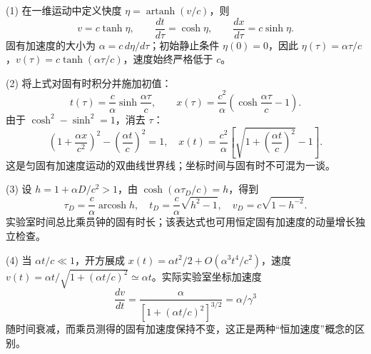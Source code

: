 (1) 在一维运动中定义快度 \(\eta=\operatorname{artanh}(v/c)\)，则
\[
v=c\tanh\eta,\qquad \frac{dt}{d\tau}=\cosh\eta,\qquad
\frac{dx}{d\tau}=c\sinh\eta.
\]
固有加速度的大小为 \(\alpha=c\,d\eta/d\tau\)；初始静止条件 \(\eta(0)=0\)，因此 \(\eta(\tau)=\alpha\tau/c\)，\(v(\tau)=c\tanh(\alpha\tau/c)\)，速度始终严格低于 \(c\)。

(2) 将上式对固有时积分并施加初值：
\[
t(\tau)=\frac c\alpha\sinh\frac{\alpha\tau}{c},\qquad
x(\tau)=\frac{c^2}{\alpha}\left(\cosh\frac{\alpha\tau}{c}-1\right).
\]
由于 \(\cosh^2-\sinh^2=1\)，消去 \(\tau\)：
\[
\left(1+\frac{\alpha x}{c^2}\right)^2-\left(\frac{\alpha t}{c}\right)^2=1,\quad
x(t)=\frac{c^2}{\alpha}\left[\sqrt{1+\left(\frac{\alpha t}{c}\right)^2}-1\right].
\]
这是匀固有加速度运动的双曲线世界线；坐标时间与固有时不可混为一谈。

(3) 设 \(h=1+\alpha D/c^2>1\)，由 \(\cosh(\alpha\tau_D/c)=h\)，得到
\[
\tau_D=\frac c\alpha\operatorname{arcosh}h,\quad
t_D=\frac c\alpha\sqrt{h^2-1},\quad
v_D=c\sqrt{1-h^{-2}}.
\]
实验室时间总比乘员钟的固有时长；该表达式也可用恒定固有加速度的动量增长独立检查。

(4) 当 \(\alpha t/c\ll1\)，开方展成 \(x(t)=\alpha t^2/2+O(\alpha^3t^4/c^2)\)，速度 \(v(t)=\alpha t/\sqrt{1+(\alpha t/c)^2}\simeq\alpha t\)。实际实验室坐标加速度
\[
\frac{dv}{dt}=\frac{\alpha}{[1+(\alpha t/c)^2]^{3/2}}
=\alpha/\gamma^3
\]
随时间衰减，而乘员测得的固有加速度保持不变，这正是两种“恒加速度”概念的区别。
